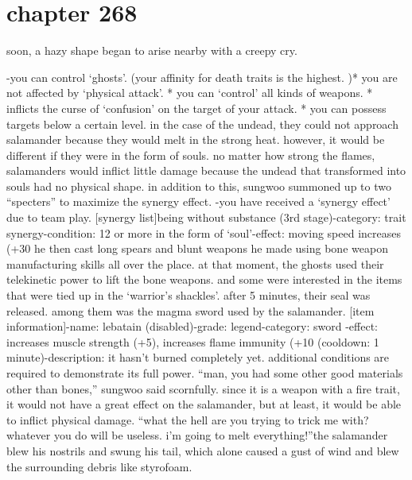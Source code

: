 \section{chapter 268}

                            soon, a hazy shape began to arise nearby with a creepy cry.





-you can control ‘ghosts’.
 (your affinity for death traits is the highest.
)* you are not affected by ‘physical attack’.
* you can ‘control’ all kinds of weapons.
* inflicts the curse of ‘confusion’ on the target of your attack.
* you can possess targets below a certain level.
in the case of the undead, they could not approach salamander because they would melt in the strong heat.
 however, it would be different if they were in the form of souls.
no matter how strong the flames, salamanders would inflict little damage because the undead that transformed into souls had no physical shape.
in addition to this, sungwoo summoned up to two “specters” to maximize the synergy effect.
-you have received a ‘synergy effect’ due to team play.
[synergy list]being without substance (3rd stage)-category: trait synergy-condition: 12 or more in the form of ‘soul’-effect: moving speed increases (+30%
he then cast long spears and blunt weapons he made using bone weapon manufacturing skills all over the place.
 at that moment, the ghosts used their telekinetic power to lift the bone weapons.
 and some were interested in the items that were tied up in the ‘warrior’s shackles’.
 after 5 minutes, their seal was released.
 among them was the magma sword used by the salamander.
[item information]-name: lebatain (disabled)-grade: legend-category: sword
-effect: increases muscle strength (+5), increases flame immunity (+10%
 (cooldown: 1 minute)-description: it hasn’t burned completely yet.
 additional conditions are required to demonstrate its full power.
“man, you had some other good materials other than bones,” sungwoo said scornfully.
since it is a weapon with a fire trait, it would not have a great effect on the salamander, but at least, it would be able to inflict physical damage.
“what the hell are you trying to trick me with? whatever you do will be useless.
 i’m going to melt everything!”the salamander blew his nostrils and swung his tail, which alone caused a gust of wind and blew the surrounding debris like styrofoam.
